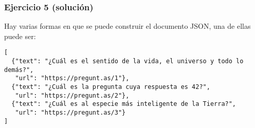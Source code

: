 \subsubsection{Ejercicio 5  (solución)}

Hay varias formas en que se puede construir el documento JSON, una de ellas puede ser:

\begin{verbatim}
[
  {"text": "¿Cuál es el sentido de la vida, el universo y todo lo demás?",
   "url": "https://pregunt.as/1"},
  {"text": "¿Cuál es la pregunta cuya respuesta es 42?",
   "url": "https://pregunt.as/2"},
  {"text": "¿Cuál es al especie más inteligente de la Tierra?",
   "url": "https://pregunt.as/3"}
]
\end{verbatim}
